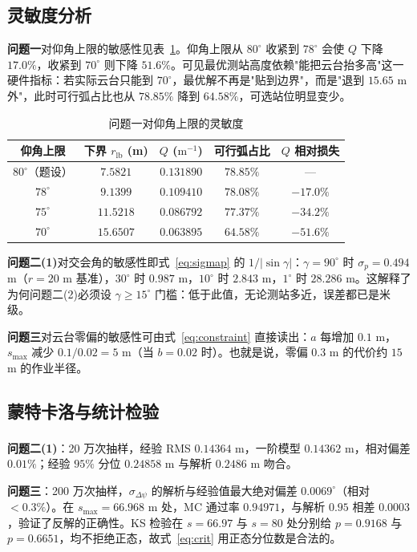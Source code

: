 \documentclass[UTF8,a4paper,zihao=-4,oneside]{ctexart}
\newcommand{\upcite}[1]{\textsuperscript{\cite{#1}}}
\begin{document}
\subsection{灵敏度分析}

\textbf{问题一}对仰角上限的敏感性见表~\ref{tab:sens1}。仰角上限从 $80^\circ$ 收紧到 $78^\circ$ 会使 $Q$ 下降 $17.0\%$，收紧到 $70^\circ$ 则下降 $51.6\%$。可见最优测站高度依赖"能把云台抬多高"这一硬件指标：若实际云台只能到 $70^\circ$，最优解不再是"贴到边界"，而是"退到 $15.65$ m 外"，此时可行弧占比也从 $78.85\%$ 降到 $64.58\%$，可选站位明显变少。

\begin{table}[htbp]
  \centering
  \caption{问题一对仰角上限的灵敏度}
  \label{tab:sens1}
  \begin{tabular}{ccccc}
    \toprule
    仰角上限 & 下界 $r_{\mathrm{lb}}$ (m) & $Q$ ($\mathrm{m^{-1}}$) & 可行弧占比 & $Q$ 相对损失 \\
    \midrule
    $80^\circ$（题设） & $7.5821$ & $0.131890$ & $78.85\%$ & — \\
    $78^\circ$ & $9.1399$ & $0.109410$ & $78.08\%$ & $-17.0\%$ \\
    $75^\circ$ & $11.5218$ & $0.086792$ & $77.37\%$ & $-34.2\%$ \\
    $70^\circ$ & $15.6507$ & $0.063895$ & $64.58\%$ & $-51.6\%$ \\
    \bottomrule
  \end{tabular}
\end{table}

\textbf{问题二(1)}对交会角的敏感性即式~\eqref{eq:sigmap} 的 $1/|\sin\gamma|$：$\gamma=90^\circ$ 时 $\sigma_p=0.494$ m（$r=20$ m 基准），$30^\circ$ 时 $0.987$ m，$10^\circ$ 时 $2.843$ m，$1^\circ$ 时 $28.286$ m。这解释了为何问题二(2)必须设 $\gamma\ge15^\circ$ 门槛：低于此值，无论测站多近，误差都已是米级。

\textbf{问题三}对云台零偏的敏感性可由式~\eqref{eq:constraint} 直接读出：$a$ 每增加 $0.1$ m，$s_{\max}$ 减少 $0.1/0.02=5$ m（当 $b=0.02$ 时）。也就是说，零偏 $0.3$ m 的代价约 $15$ m 的作业半径。

\subsection{蒙特卡洛与统计检验}

\textbf{问题二(1)}：20 万次抽样\upcite{robert2004mc}，经验 RMS $0.14364$ m，一阶模型 $0.14362$ m，相对偏差 $0.01\%$；经验 $95\%$ 分位 $0.24858$ m 与解析 $0.2486$ m 吻合。

\textbf{问题三}：200 万次抽样，$\sigma_{\Delta\psi}$ 的解析与经验值最大绝对偏差 $0.0069^\circ$（相对 $<0.3\%$）。在 $s_{\max}=66.968$ m 处，MC 通过率 $0.94971$，与解析 $0.95$ 相差 $0.0003$，验证了反解的正确性。KS 检验在 $s=66.97$ 与 $s=80$ 处分别给 $p=0.9168$ 与 $p=0.6651$，均不拒绝正态，故式~\eqref{eq:crit} 用正态分位数是合法的。
\end{document}
